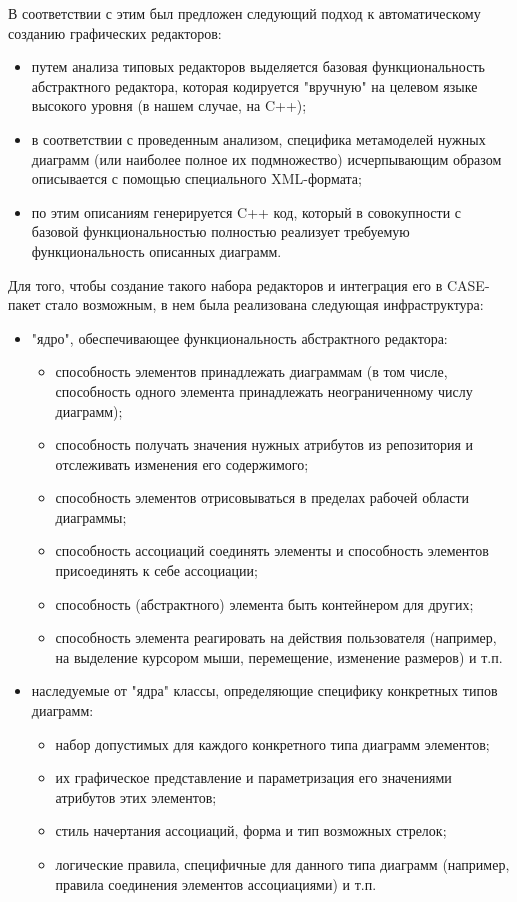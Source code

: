 \documentclass[a5paper]{article}
\begin{document}
В соответствии с этим был предложен следующий подход к автоматическому
созданию графических редакторов: 

\begin{itemize}
  \item путем анализа типовых редакторов выделяется базовая функциональность
	абстрактного редактора, которая кодируется "вручную" на целевом языке
	высокого уровня (в нашем случае, на C++);
  \item в соответствии с проведенным анализом, специфика метамоделей нужных
	диаграмм (или наиболее полное их подмножество) исчерпывающим образом
	описывается с помощью специального XML-формата;
  \item по этим описаниям генерируется C++ код,
	который в совокупности с базовой функциональностью полностью реализует
	требуемую функциональность описанных диаграмм.
\end{itemize}

Для того, чтобы создание такого набора редакторов и интеграция его в
CASE-пакет стало возможным, в нем была реализована следующая инфраструктура:

\begin{itemize}
  \item "ядро", обеспечивающее функциональность абстрактного редактора:
    \begin{itemize}
      \item способность элементов принадлежать диаграммам (в том числе, способность
	    одного элемента принадлежать неограниченному числу диаграмм);
	  \item способность получать значения нужных атрибутов из репозитория и
	    отслеживать изменения его содержимого;
	  \item способность элементов отрисовываться в пределах рабочей области
	    диаграммы;
	  \item способность ассоциаций соединять элементы и способность элементов
	    присоединять к себе ассоциации;
	  \item способность (абстрактного) элемента быть контейнером для других;
	  \item способность элемента реагировать на действия пользователя (например, на
	    выделение курсором мыши, перемещение, изменение размеров) и т.п.
    \end{itemize}
  \item наследуемые от "ядра" классы, определяющие специфику конкретных типов
	диаграмм:
	\begin{itemize}
	  \item набор допустимых для каждого конкретного типа диаграмм элементов;
	  \item их графическое представление и параметризация его значениями атрибутов
		этих элементов;
	  \item стиль начертания ассоциаций, форма и тип возможных стрелок;
	  \item логические правила, специфичные для данного типа диаграмм (например,
		правила соединения элементов ассоциациями) и т.п.
	\end{itemize}
\end{itemize}
\end{document}
